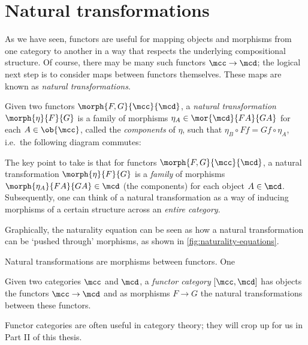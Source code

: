 \section{Natural transformations}

As we have seen, functors are useful for mapping objects and morphisms from one
category to another in a way that respects the underlying compositional
structure.
Of course, there may be many such functors \(\mcc \to \mcd\); the logical next
step is to consider maps between functors themselves.
These maps are known as \emph{natural transformations}.

\begin{definition}
    Given two functors \(\morph{F, G}{\mcc}{\mcd}\), a
    \emph{natural transformation} \(\morph{\eta}{F}{G}\) is a family of
    morphisms \(
        \eta_A \in \mor{\mcd}{FA}{GA}
    \) for each \(A \in \ob{\mcc}\), called the \emph{components} of \(\eta\),
    such that \(
        \eta_B \circ Ff = Gf \circ \eta_A
    \), i.e.\ the following diagram commutes:
    \begin{center}
        
    \end{center}
\end{definition}

The key point to take is that for functors \(\morph{F,G}{\mcc}{\mcd}\), a
natural transformation \(\morph{\eta}{F}{G}\) is a \emph{family} of morphisms
\(\morph{\eta_A}{FA}{GA} \in \mcd\) (the components) for each object
\(A \in \mcd\).
Subsequently, one can think of a natural transformation as a way of inducing
morphisms of a certain structure across an \emph{entire category}.

Graphically, the naturality equation can be seen as how a natural transformation
can be `pushed through' morphisms, as shown in \cref{fig:naturality-equations}.



Natural transformations are morphisms between functors.
One

\begin{definition}
    Given two categories \(\mcc\) and \(\mcd\), a \emph{functor category}
    \([\mcc,\mcd]\) has objects the functors \(\mcc \to \mcd\) and as morphisms
    \(F \to G\) the natural transformations between these functors.
\end{definition}

Functor categories are often useful in category theory; they will crop up for us
in Part II of this thesis.

